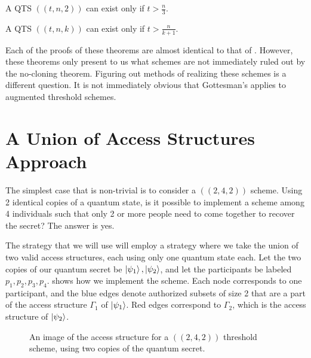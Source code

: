 \begin{theorem}
	\label{thm:qts2}
	A QTS $((t,n, 2))$ can exist only if $t > \frac{n}{3}$.
\end{theorem}

\begin{theorem}
	\label{thm:qtsk}
	A QTS $((t,n, k))$ can exist only if $t > \frac{n}{k+1}$.
\end{theorem}

Each of the proofs of these theorems are almost identical to that of . However, these theorems only present to us what schemes are not immediately ruled out by the no-cloning theorem. Figuring out methods of realizing these schemes is a different question. It is not immediately obvious that Gottesman's  applies to augmented threshold schemes.

\section{A Union of Access Structures Approach}

The simplest case that is non-trivial is to consider a $((2,4,2))$ scheme. Using 2 identical copies of a quantum state, is it possible to implement a scheme among 4 individuals such that only 2 or more people need to come together to recover the secret? The answer is yes.

The strategy that we will use will employ a strategy where we take the union of two valid access structures, each using only one quantum state each. Let the two copies of our quantum secret be $\ket{\psi_1}, \ket{\psi_2}$, and let the participants be labeled $p_1, p_2, p_3, p_4$.  shows how we implement the scheme. Each node corresponds to one participant, and the blue edges denote authorized subsets of size 2 that are a part of the access structure $\Gamma_1$ of $\ket{\psi_1}$. Red edges correspond to $\Gamma_2$, which is the access structure of $\ket{\psi_2}$.


\begin{figure}[ht]
	\begin{center}
	\end{center}
	\caption{An image of the access structure for a $((2,4,2))$ threshold scheme, using two copies of the quantum secret.}
	\label{fig:2-4-2}
\end{figure}


